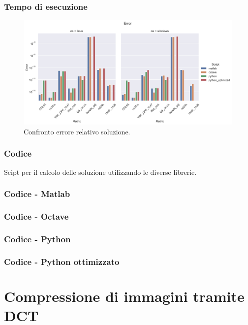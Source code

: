 \documentclass{beamer}
\begin{document}
\begin{frame}
	\frametitle{Tempo di esecuzione}
	\begin{figure}
		\includegraphics[width=1.35\textheight]{assets/error.jpg}
		\caption{Confronto errore relativo soluzione.}
		\label{fig:error}
	\end{figure}
\end{frame}


\begin{frame}
\frametitle{Codice}
Scipt per il calcolo delle soluzione utilizzando le diverse librerie.
\end{frame}


\begin{frame}
	\frametitle{Codice - Matlab}
	
\end{frame}


\begin{frame}
	\frametitle{Codice - Octave}
	
\end{frame}


\begin{frame}
	\frametitle{Codice - Python}
	
\end{frame}


\begin{frame}
	\frametitle{Codice - Python ottimizzato}
	
\end{frame}

\section{Compressione di immagini tramite DCT}
\end{document}
